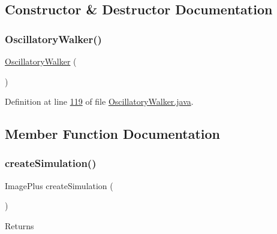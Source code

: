 \subsection{Constructor \& Destructor Documentation}
\hypertarget{classdata_1_1_oscillatory_walker_ad2f07a526bf7192224e41a93355496ee}{}\label{classdata_1_1_oscillatory_walker_ad2f07a526bf7192224e41a93355496ee} 
\subsubsection{\texorpdfstring{Oscillatory\+Walker()}{OscillatoryWalker()}}
{\footnotesize\ttfamily \hyperlink{classdata_1_1_oscillatory_walker}{Oscillatory\+Walker} (\begin{DoxyParamCaption}{ }\end{DoxyParamCaption})}



Definition at line \hyperlink{_oscillatory_walker_8java_source_l00119}{119} of file \hyperlink{_oscillatory_walker_8java_source}{Oscillatory\+Walker.\+java}.



\subsection{Member Function Documentation}
\hypertarget{classdata_1_1_oscillatory_walker_ad015489397f3b1157e02d08913211ee4}{}\label{classdata_1_1_oscillatory_walker_ad015489397f3b1157e02d08913211ee4} 
\subsubsection{\texorpdfstring{create\+Simulation()}{createSimulation()}}
{\footnotesize\ttfamily Image\+Plus create\+Simulation (\begin{DoxyParamCaption}{ }\end{DoxyParamCaption})}

\begin{DoxyReturn}{Returns}

\end{DoxyReturn}


